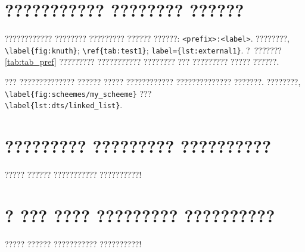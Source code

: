 \section{??????????? ???????? ??????}\label{app:B4}

???????????? ???????? ????????? ?????? ??????: \texttt{<prefix>:<label>}.
????????, \verb+\label{fig:knuth}+; \verb+\ref{tab:test1}+; \verb+label={lst:external1}+.
?~??????? \cref{tab:tab_pref} ????????? ??????????? ???????? ??? ?????????
????? ??????.

\begin{table}[htbp]
    \captionsetup{justification=centering}
\end{table}


??? ?????????????? ?????? ????? ???????????? ?????????????? ???????.
????????, \verb+\label{fig:scheemes/my_scheeme}+ ??? \\ \verb+\label{lst:dts/linked_list}+.

\section{????????? ????????? ??????????}\label{app:B5}

????? ?????? ??????????? ??????????!

\section{? ??? ???? ????????? ??????????}\label{app:B6}

????? ?????? ??????????? ??????????!

\clearpage
{}


